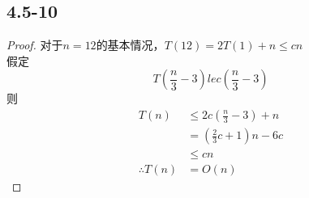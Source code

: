 \documentclass[twocolumn]{article}
\begin{document}
	\subsection*{4.5-10}
	\begin{proof}
		对于$n=12$的基本情况，$T(12)=2T(1)+n\le cn$\\
		假定
		$$T\left(\frac{n}{3}-3\right)le c\left(\frac{n}{3}-3\right) $$
		则
		\[
			\begin{aligned}
				T(n)&\le 2c\left(\frac{n}{3}-3\right)+n\\
				&=\left(\frac{2}{3}c+1\right)n-6c\\
				&\le cn\\
				\therefore T(n)&=O(n)
			\end{aligned}	
		\]
	\end{proof}
	
\end{document}
